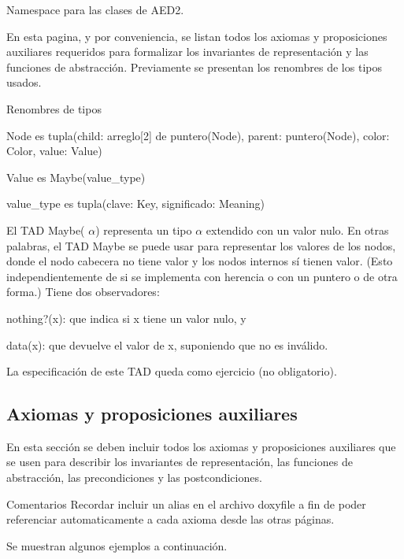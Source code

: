 \-Namespace para las clases de \-A\-E\-D2.

\-En esta pagina, y por conveniencia, se listan todos los axiomas y proposiciones auxiliares requeridos para formalizar los invariantes de representación y las funciones de abstracción. \-Previamente se presentan los renombres de los tipos usados.

\begin{DoxyParagraph}{\-Renombres de tipos}

\end{DoxyParagraph}

\begin{DoxyItemize}
\item \-Node es tupla(child\-: arreglo\mbox{[}2\mbox{]} de puntero(\-Node), parent\-: puntero(\-Node), color\-: \-Color, value\-: \-Value)
\item \-Value es \-Maybe(value\-\_\-type)
\item value\-\_\-type es tupla(clave\-: \-Key, significado\-: \-Meaning)
\end{DoxyItemize}

\-El \-T\-A\-D \-Maybe( $\alpha$) representa un tipo $\alpha$ extendido con un valor nulo. \-En otras palabras, el \-T\-A\-D \-Maybe se puede usar para representar los valores de los nodos, donde el nodo cabecera no tiene valor y los nodos internos sí tienen valor. (\-Esto independientemente de si se implementa con herencia o con un puntero o de otra forma.) \-Tiene dos observadores\-:
\begin{DoxyItemize}
\item nothing?(x)\-: que indica si x tiene un valor nulo, y
\item data(x)\-: que devuelve el valor de x, suponiendo que no es inválido.
\end{DoxyItemize}

\-La especificación de este \-T\-A\-D queda como ejercicio (no obligatorio).\hypertarget{axiomas_sec-Axiomas}{}\subsection{\-Axiomas y proposiciones auxiliares}\label{axiomas_sec-Axiomas}
\-En esta sección se deben incluir todos los axiomas y proposiciones auxiliares que se usen para describir los invariantes de representación, las funciones de abstracción, las precondiciones y las postcondiciones.

\begin{DoxyRemark}{\-Comentarios}
\-Recordar incluir un alias en el archivo doxyfile a fin de poder referenciar automaticamente a cada axioma desde las otras páginas.
\end{DoxyRemark}
\-Se muestran algunos ejemplos a continuación.

